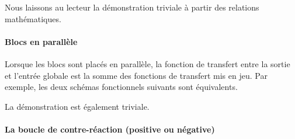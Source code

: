 Nous laissons au lecteur la démonstration triviale à partir des relations mathématiques.


\paragraph{Blocs en parallèle} 

Lorsque les blocs sont placés en parallèle, la fonction de transfert 
entre la sortie et l'entrée globale est la somme des fonctions de transfert mis en jeu.
Par exemple, les deux schémas fonctionnels suivants sont équivalents.

\begin{center}

\end{center}

La démonstration est également triviale.

\paragraph{La boucle de contre-réaction (positive ou négative)\label{sec-boucle}}

